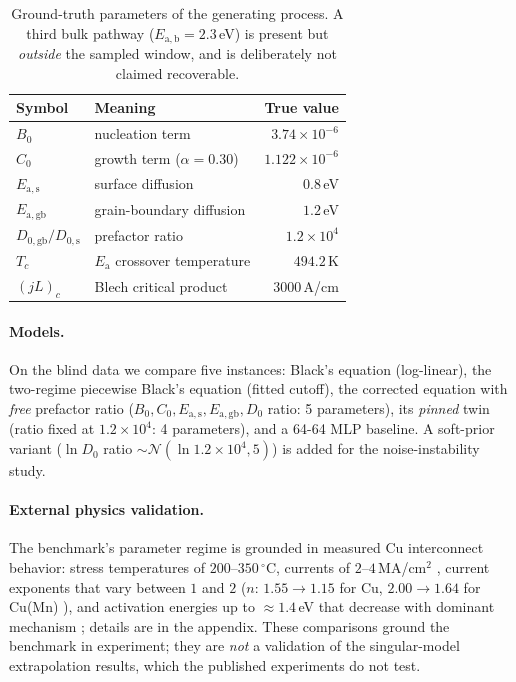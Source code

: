 \documentclass{article}
\newcommand{\Ea}{E_{\mathrm{a}}}
\newcommand{\Eab}{E_{\mathrm{a,b}}}
\begin{document}
\begin{table}[t]
\centering\small
\begin{tabular}{llr}
\toprule
Symbol & Meaning & True value \\
\midrule
$B_0$ & nucleation term & $3.74\times10^{-6}$ \\
$C_0$ & growth term ($\alpha=0.30$) & $1.122\times10^{-6}$ \\
$E_{\mathrm{a,s}}$ & surface diffusion & $0.8$\,eV \\
$E_{\mathrm{a,gb}}$ & grain-boundary diffusion & $1.2$\,eV \\
$D_{0,\mathrm{gb}}/D_{0,\mathrm{s}}$ & prefactor ratio & $1.2\times10^{4}$ \\
$T_c$ & $\Ea$ crossover temperature & $494.2$\,K \\
$(jL)_c$ & Blech critical product & $3000$\,A/cm \\
\bottomrule
\end{tabular}
\caption{Ground-truth parameters of the generating process. A third bulk
pathway ($\Eab=2.3$\,eV) is present but \emph{outside} the sampled
window, and is deliberately not claimed recoverable.}
\label{tab:params}
\end{table}

\paragraph{Models.} On the blind data we compare five instances: Black's
equation (log-linear), the two-regime piecewise Black's equation (fitted
cutoff), the corrected equation with \emph{free} prefactor ratio
($B_0,C_0,E_{\mathrm{a,s}},E_{\mathrm{a,gb}},D_{0}$ ratio: 5 parameters), its
\emph{pinned} twin (ratio fixed at $1.2\times10^4$: 4 parameters), and a
64-64 MLP baseline. A soft-prior variant
($\ln D_{0}$ ratio $\sim\mathcal{N}(\ln1.2\times10^4,5)$) is added for the
noise-instability study.
\paragraph{External physics validation.} The benchmark's parameter regime is
grounded in measured Cu interconnect behavior: stress temperatures of
$200$--$350\,^\circ$C, currents of $2$--$4$\,MA/cm$^2$ \citep{arnaud2013},
current exponents that vary between $1$ and $2$
($n{:}\,1.55\to1.15$ for Cu, $2.00\to1.64$ for Cu(Mn) \citep{gall2013}), and
activation energies up to $\approx1.4$\,eV that decrease with dominant
mechanism \citep{arnaud2013,gall2013}; details are in the appendix. These
comparisons ground the benchmark in experiment; they are \emph{not} a
validation of the singular-model extrapolation results, which the published
experiments do not test.
\end{document}
